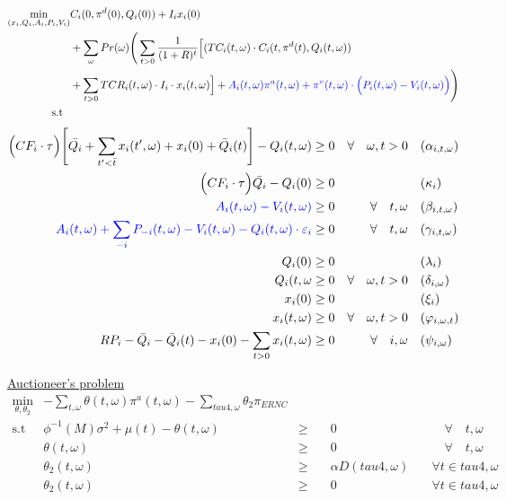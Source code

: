 \documentclass[11pt, letterpaper]{article}
\newcommand{\pia}{\textcolor[rgb]{0,0,1}}
\begin{document}
\begin{align}
\min_{(x_i,Q_i,A_i,P_i,V_i)} &  C_i(0, \pi^d(0),Q_i(0))+ I_i x_i(0) \nonumber \\ &+\sum_{\omega} Pr(\omega)   \Bigg( \sum_{t>0} \frac{1}{(1+R)^t} \Big[ (TC_i(t,\omega)\cdot C_i(t,\pi^d(t),Q_i(t,\omega) )  \nonumber \\
 & + \sum_{t > 0} TCR_i(t,\omega) \cdot I_i\cdot x_i(t,\omega) \Big] + \pia{A_i(t,\omega)\pi^a(t,\omega)+\pi^v(t,\omega)\cdot \Big(P_i(t,\omega)-V_i(t,\omega)\Big)} \Bigg)  \\
     \textrm{s.t \ } \nonumber
\end{align}
\begin{align}
    \Big(CF_i \cdot\tau\Big)  \Bigg[\bar{Q_i} + \sum_{t^{\prime}<\bar{t}} x_i(t^\prime,\omega) + x_i(0)+ \bar{Q}_i(t) \Bigg] - Q_i(t,\omega) & \geq 0  & \forall  \quad \omega, t  > 0 & \quad (\alpha_{i,t,\omega}) \\
    \Big(CF_i\cdot\tau \Big)\bar{Q_i}-Q_{i}(0) & \geq 0  &  \quad & \quad (\kappa_i) \\
\pia{A_i(t,\omega) - V_i(t,\omega) } & \geq  0  & \forall  \quad t,\omega & \quad (\beta_{i,t,\omega})\\
  \pia{ A_i(t,\omega) + \sum_{-i}P_{-i}(t,\omega) - V_i(t,\omega)-Q_i(t, \omega)\cdot \varepsilon_{i}} & \geq  0  &\forall \quad t,\omega & \quad (\gamma_{i,t,\omega})\\
 Q_i(0) & \geq  0 & \quad & \quad (\lambda_i)\\
 Q_i(t, \omega & \geq  0   & \forall  \quad \omega, t >0 & \quad (\delta_{i,\omega})\\
  x_i(0) & \geq  0 & \quad & \quad (\xi_i)\\
  x_i(t, \omega) & \geq  0   & \forall  \quad \omega, t >0 & \quad (\varphi_{i,\omega,t})\\
 RP_i - \bar{Q}_i - \bar{Q}_i(t) - x_i(0) - \sum_{t > 0} x_i(t,\omega)  &  \geq 0 &  \forall \quad i,\omega &  \quad (\psi_{i,\omega}) 
  \end{align}

\underline{Auctioneer's problem}
\pia{
\begin{align}
    \min_{\theta, \theta_2} & -\sum_{t,\omega} \theta(t,\omega) \pi^{a}(t,\omega) - \sum_{tau4,\omega} \theta_2 \pi_{ERNC}  & &  &\\
    \textrm{s.t \ } &  \phi^{-1}(M) \sigma^2 + \mu(t) - \theta(t,\omega) &  \geq & \quad 0  &\quad \quad  \forall  \quad t,\omega\\
    &  \theta(t,\omega)  & \geq & \quad 0 & \quad \quad  \forall \quad t,\omega\\
    & \theta_2(t,\omega) & \geq & \quad  \alpha D(tau4,\omega) & \quad \forall t \in tau4,\omega \\
    & \theta_2(t,\omega) & \geq & \quad 0 & \quad \forall t \in tau4,\omega 
\end{align}
}
\vspace{0.5cm}
\end{document}
